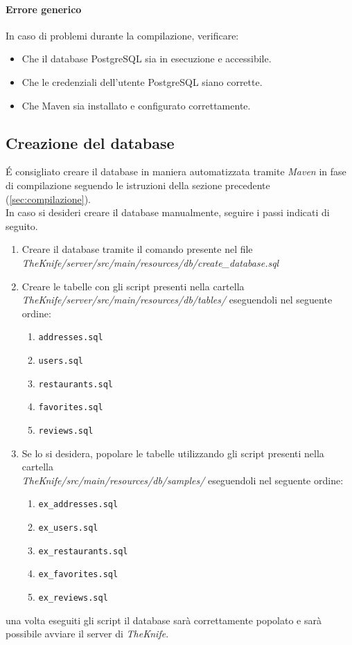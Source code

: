 \paragraph{Errore generico}
In caso di problemi durante la compilazione, verificare:
\begin{itemize}
    \item Che il database PostgreSQL sia in esecuzione e accessibile.
    \item Che le credenziali dell'utente PostgreSQL siano corrette.
    \item Che Maven sia installato e configurato correttamente.
\end{itemize}

\subsection{Creazione del database}
\label{sec:creazione_db}
\'E consigliato creare il database in maniera automatizzata
tramite \textit{Maven} in fase di compilazione seguendo le 
istruzioni della sezione precedente (\ref{sec:compilazione}).\\
In caso si desideri creare il database manualmente, seguire i 
passi indicati di seguito.
\begin{enumerate}
    \item Creare il database tramite il comando presente 
    nel file 
    \textit{TheKnife/server/src/main/resources/db/create\_database.sql}
    \item Creare le tabelle con gli script presenti nella cartella
    \textit{TheKnife/server/src/main/resources/db/tables/}
    eseguendoli nel seguente ordine:
    \begin{enumerate}
        \item \texttt{addresses.sql}
        \item \texttt{users.sql}
        \item \texttt{restaurants.sql}
        \item \texttt{favorites.sql}
        \item \texttt{reviews.sql}
    \end{enumerate}
    \item Se lo si desidera, popolare le tabelle utilizzando gli script
    presenti nella cartella\\
    \textit{TheKnife/src/main/resources/db/samples/} 
    eseguendoli nel seguente ordine:
    \begin{enumerate}
        \item \texttt{ex\_addresses.sql}
        \item \texttt{ex\_users.sql}
        \item \texttt{ex\_restaurants.sql}
        \item \texttt{ex\_favorites.sql}
        \item \texttt{ex\_reviews.sql}
    \end{enumerate}
\end{enumerate}
una volta eseguiti gli script il database sarà correttamente 
popolato e sarà possibile avviare il server 
di \textit{TheKnife}.

